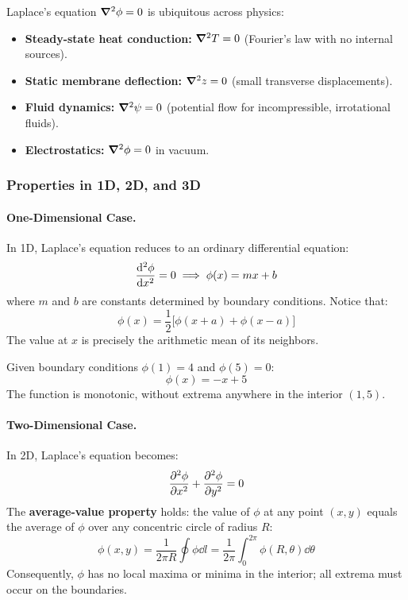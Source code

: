 Laplace's equation $\grad^2\phi = 0$ is ubiquitous across physics:
\begin{itemize}
    \item \textbf{Steady-state heat conduction:} $\grad^2 T = 0$ (Fourier's law with no internal sources).
    \item \textbf{Static membrane deflection:} $\grad^2 z = 0$ (small transverse displacements).
    \item \textbf{Fluid dynamics:} $\grad^2 \psi = 0$ (potential flow for incompressible, irrotational fluids).
    \item \textbf{Electrostatics:} $\grad^2\phi = 0$ in vacuum.
\end{itemize}

\subsubsection*{Properties in 1D, 2D, and 3D}

\paragraph{One-Dimensional Case.}
In 1D, Laplace's equation reduces to an ordinary differential equation:
\begin{equation}
    \dv[2]{\phi}{x} = 0 \implies \phi(x) = mx + b
\end{equation}
where $m$ and $b$ are constants determined by boundary conditions. Notice that:
\begin{equation}
    \phi(x) = \frac{1}{2}\big[\phi(x + a) + \phi(x - a)\big]
\end{equation}
The value at $x$ is precisely the arithmetic mean of its neighbors.

\begin{example}
Given boundary conditions $\phi(1) = 4$ and $\phi(5) = 0$:
\begin{equation}
    \phi(x) = -x + 5
\end{equation}
The function is monotonic, without extrema anywhere in the interior $(1, 5)$.
\end{example}

\paragraph{Two-Dimensional Case.}
In 2D, Laplace's equation becomes:
\begin{equation}
    \pdv[2]{\phi}{x} + \pdv[2]{\phi}{y} = 0
\end{equation}
The \textbf{average-value property} holds: the value of $\phi$ at any point $(x,y)$ equals the average of $\phi$ over any concentric circle of radius $R$:
\begin{equation}
    \phi(x,y) = \frac{1}{2\pi R} \oint \phi \dd{l} = \frac{1}{2\pi}\int_0^{2\pi} \phi(R, \theta) \dd{\theta}
\end{equation}
Consequently, $\phi$ has no local maxima or minima in the interior; all extrema must occur on the boundaries. 

